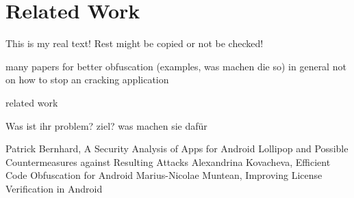 \section{Related Work}\label{section:introduction-related}
This is my real text! Rest might be copied or not be checked!

many papers  for better obfuscation (examples, was machen die so) in general not on how to stop an cracking application

related work

Was ist ihr problem? ziel? was machen sie dafür

Patrick Bernhard, A Security Analysis of Apps for Android Lollipop and Possible Countermeasures against Resulting Attacks \cite{bernhardSecurity}
Alexandrina Kovacheva, Efficient Code Obfuscation for Android \cite{kovachevaMaster}
Marius-Nicolae Muntean, Improving License Verification in Android \cite{munteanLicense}
